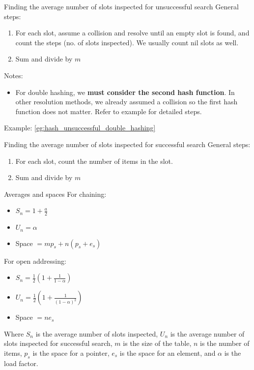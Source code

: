 \begin{theorem}
    {Finding the average number of slots inspected for unsuccessful search}
    General steps:
    \begin{enumerate}
        \item For each slot, assume a collision and resolve until an empty slot is found, and count the steps (no. of slots inspected). We usually count nil slots as well.
        \item Sum and divide by $m$
    \end{enumerate}
    Notes:
    \begin{itemize}
        \item For double hashing, we \textbf{must consider the second hash function}. In other resolution methods, we already assumed a collision so the first hash function does not matter. Refer to example for detailed steps.
    \end{itemize}
    \tcblower
    Example: \ref{eg:hash_unsuccessful_double_hashing}
\end{theorem}
\label{thm:hash_unsuccessful_average_slots_inspected}

\begin{theorem}
    {Finding the average number of slots inspected for successful search}
    General steps:
    \begin{enumerate}
        \item For each slot, count the number of items in the slot.
        \item Sum and divide by $m$
    \end{enumerate}
\end{theorem}

\begin{knBox}
    {Averages and spaces}
    For chaining:
    \begin{itemize}
        \item $S_n=1+\frac{a}{2}$
        \item $U_n=\alpha$
        \item Space $=mp_s+n(p_s+e_s)$
    \end{itemize}
    For open addressing:
    \begin{itemize}
        \item $S_n=\frac12(1+\frac{1}{1-\alpha})$
        \item $U_n=\frac12(1+\frac{1}{(1-\alpha)^2})$
        \item Space $=ne_s$
    \end{itemize}
    Where $S_n$ is the average number of slots inspected, $U_n$ is the average number of slots inspected for successful search, $m$ is the size of the table, $n$ is the number of items, $p_s$ is the space for a pointer, $e_s$ is the space for an element, and $\alpha$ is the load factor.
\end{knBox}

